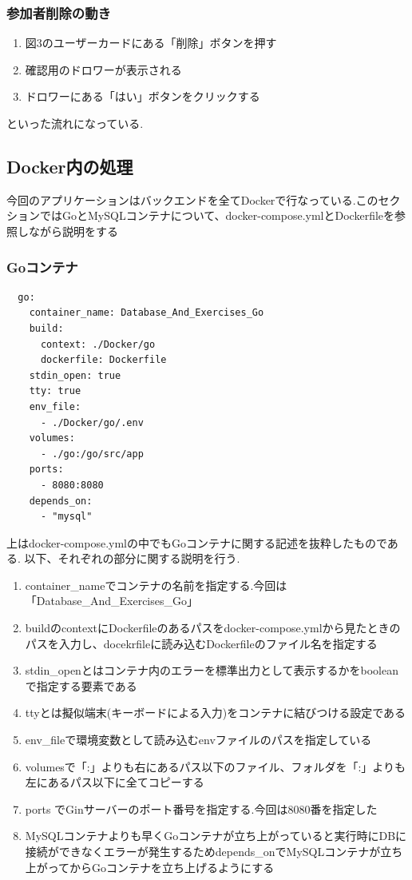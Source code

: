 \documentclass[submit,techrep]{ipsj}
\begin{document}
\subsubsection{参加者削除の動き}
\begin{enumerate}
  \item 図3のユーザーカードにある「削除」ボタンを押す
  \item 確認用のドロワーが表示される
  \item ドロワーにある「はい」ボタンをクリックする
 \end{enumerate}
といった流れになっている.

\subsection{Docker内の処理}
今回のアプリケーションはバックエンドを全てDockerで行なっている.このセクションではGoとMySQLコンテナについて、docker-compose.ymlとDockerfileを参照しながら説明をする
\subsubsection{Goコンテナ}
\begin{verbatim}
  go:
    container_name: Database_And_Exercises_Go
    build:
      context: ./Docker/go
      dockerfile: Dockerfile
    stdin_open: true
    tty: true
    env_file:
      - ./Docker/go/.env
    volumes:
      - ./go:/go/src/app
    ports:
      - 8080:8080
    depends_on:
      - "mysql"
\end{verbatim}
上はdocker-compose.ymlの中でもGoコンテナに関する記述を抜粋したものである.
以下、それぞれの部分に関する説明を行う.
\begin{enumerate}
  \item container\_nameでコンテナの名前を指定する.今回は「Database\_And\_Exercises\_Go」
  \item buildのcontextにDockerfileのあるパスをdocker-compose.ymlから見たときのパスを入力し、docekrfileに読み込むDockerfileのファイル名を指定する
  \item  stdin\_openとはコンテナ内のエラーを標準出力として表示するかをbooleanで指定する要素である
  \item ttyとは擬似端末(キーボードによる入力)をコンテナに結びつける設定である
  \item  env\_fileで環境変数として読み込むenvファイルのパスを指定している
  \item volumesで「:」よりも右にあるパス以下のファイル、フォルダを「:」よりも左にあるパス以下に全てコピーする
  \item  ports
  でGinサーバーのポート番号を指定する.今回は8080番を指定した
  \item MySQLコンテナよりも早くGoコンテナが立ち上がっていると実行時にDBに接続ができなくエラーが発生するためdepends\_onでMySQLコンテナが立ち上がってからGoコンテナを立ち上げるようにする
 \end{enumerate}
 
\end{document}
